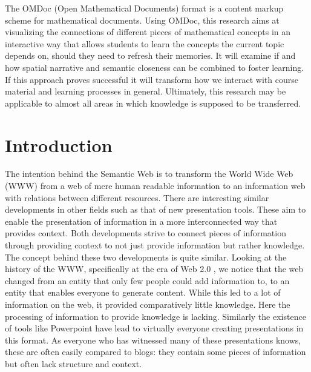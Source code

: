 \documentclass[twoside, 12pt]{article}
\begin{document}
The OMDoc (Open Mathematical Documents) format \cite{Kohlhase:OMDoc1.2} is a content markup scheme for mathematical documents. Using OMDoc, this research aims at visualizing the connections of different pieces of mathematical concepts in an interactive way that allows students to learn the concepts the current topic depends on, should they need to refresh their memories. It will examine if and how spatial narrative and semantic closeness can be combined to foster learning. If this approach proves successful it will transform how we interact with course material and learning processes in general. Ultimately, this research may be applicable to almost all areas in which knowledge is supposed to be transferred.\\ 

  \newpage
  \tableofcontents

  \clearpage

  \section{Introduction}
  \label{sec:introduction}

The intention behind the Semantic Web \cite{BernersLee:tsw98} is to transform the World Wide Web (WWW) from a web of mere human readable information to an information web with relations between different resources. There are interesting similar developments in other fields such as that of new presentation tools. These aim to enable the presentation of information in a more interconnected way that provides context. Both developments strive to connect pieces of information through providing context to not just provide information but rather knowledge.\\

The concept behind these two developments is quite similar. Looking at the history of the WWW, specifically at the era of Web 2.0 \cite{Weller:npentrel14}, we notice that the web changed from an entity that only few people could add information to, to an entity that enables everyone to generate content. While this led to a lot of information on the web, it provided comparatively little knowledge. Here the processing of information to provide knowledge is lacking. Similarly the existence of tools like Powerpoint have lead to virtually everyone creating presentations in this format. As everyone who has witnessed many of these presentations knows, these are often easily compared to blogs: they contain some pieces of information but often lack structure and context.\\
\end{document}
